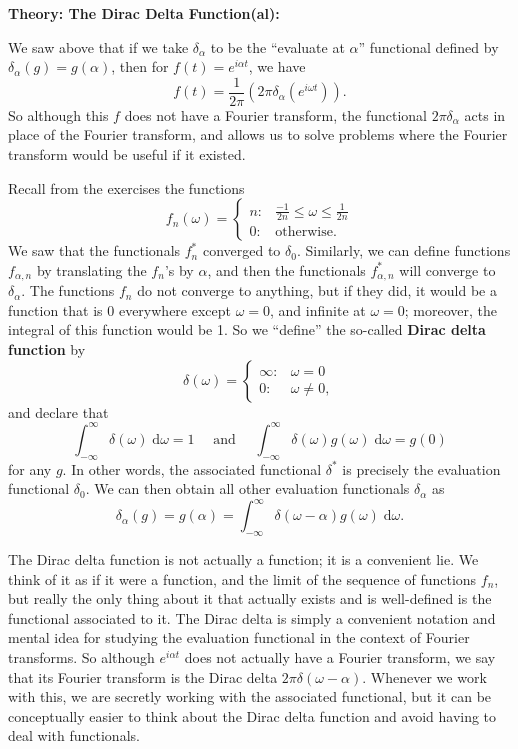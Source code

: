 \documentclass{article}
\newcommand{\diff}{\;\mathrm{d}}
\begin{document}
\textbf{Theory: The Dirac Delta Function(al):}\bigskip


We saw above that if we take $\delta_\alpha$ to be the ``evaluate at $\alpha$'' functional defined by $\delta_\alpha(g)=g(\alpha)$, then for $f(t)=e^{i\alpha t}$, we have
\[f(t)=\frac{1}{2\pi}\left(2\pi \delta_\alpha\left(e^{i\omega t}\right)\right).\]
So although this $f$ does not have a Fourier transform, the functional $2\pi \delta_\alpha$ acts in place of the Fourier transform, and allows us to solve problems where the Fourier transform would be useful if it existed.

Recall from the exercises the functions
\[f_n(\omega)=\begin{cases}
			n:& \frac{-1}{2n}\leq \omega \leq \frac{1}{2n}\\
			0:& \mbox{otherwise}.
		\end{cases}\]
We saw that the functionals $f_n^*$ converged to $\delta_0$. Similarly, we can define functions $f_{\alpha,n}$ by translating the $f_n$'s by $\alpha$, and then the functionals $f_{\alpha,n}^*$ will converge to $\delta_\alpha$. The functions $f_n$ do not converge to anything, but if they did, it would be a function that is 0 everywhere except $\omega=0$, and infinite at $\omega=0$; moreover, the integral of this function would be 1. So we ``define'' the so-called \textbf{Dirac delta function} by
\[\delta(\omega)=\begin{cases} \infty: & \omega=0\\ 0: & \omega \neq 0,\end{cases}\]
and declare that
\[\int_{-\infty}^\infty \delta(\omega)\diff \omega =1\quad \mbox{ and }\quad \int_{-\infty}^\infty \delta(\omega)g(\omega)\diff \omega = g(0)\]
for any $g$. In other words, the associated functional $\delta^*$ is precisely the evaluation functional $\delta_0$. We can then obtain all other evaluation functionals $\delta_\alpha$ as
\[\delta_\alpha(g)=g(\alpha)=\int_{-\infty}^\infty \delta(\omega-\alpha)g(\omega)\diff \omega.\]

The Dirac delta function is not actually a function; it is a convenient lie. We think of it as if it were a function, and the limit of the sequence of functions $f_n$, but really the only thing about it that actually exists and is well-defined is the functional associated to it. The Dirac delta is simply a convenient notation and mental idea for studying the evaluation functional in the context of Fourier transforms. So although $e^{i\alpha t}$ does not actually have a Fourier transform, we say that its Fourier transform is the Dirac delta $2\pi\delta(\omega-\alpha)$. Whenever we work with this, we are secretly working with the associated functional, but it can be conceptually easier to think about the Dirac delta function and avoid having to deal with functionals.
\end{document}

